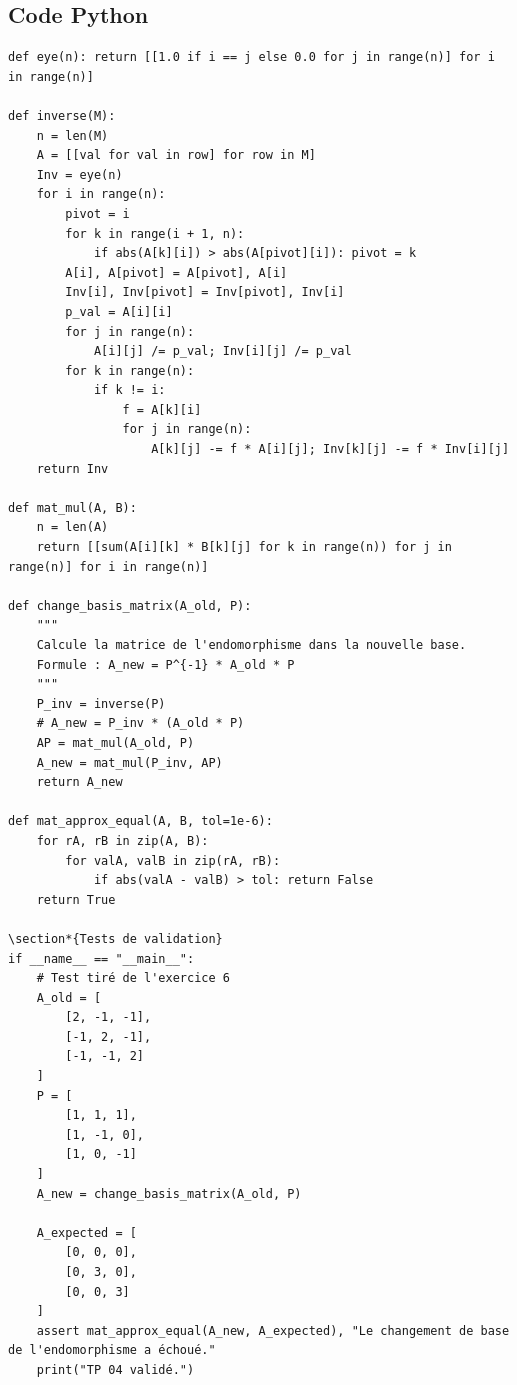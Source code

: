 \documentclass{report}
\begin{document}
\subsection*{Code Python}
\begin{verbatim}
def eye(n): return [[1.0 if i == j else 0.0 for j in range(n)] for i in range(n)]

def inverse(M):
    n = len(M)
    A = [[val for val in row] for row in M]
    Inv = eye(n)
    for i in range(n):
        pivot = i
        for k in range(i + 1, n):
            if abs(A[k][i]) > abs(A[pivot][i]): pivot = k
        A[i], A[pivot] = A[pivot], A[i]
        Inv[i], Inv[pivot] = Inv[pivot], Inv[i]
        p_val = A[i][i]
        for j in range(n):
            A[i][j] /= p_val; Inv[i][j] /= p_val
        for k in range(n):
            if k != i:
                f = A[k][i]
                for j in range(n):
                    A[k][j] -= f * A[i][j]; Inv[k][j] -= f * Inv[i][j]
    return Inv

def mat_mul(A, B):
    n = len(A)
    return [[sum(A[i][k] * B[k][j] for k in range(n)) for j in range(n)] for i in range(n)]

def change_basis_matrix(A_old, P):
    """
    Calcule la matrice de l'endomorphisme dans la nouvelle base.
    Formule : A_new = P^{-1} * A_old * P
    """
    P_inv = inverse(P)
    # A_new = P_inv * (A_old * P)
    AP = mat_mul(A_old, P)
    A_new = mat_mul(P_inv, AP)
    return A_new

def mat_approx_equal(A, B, tol=1e-6):
    for rA, rB in zip(A, B):
        for valA, valB in zip(rA, rB):
            if abs(valA - valB) > tol: return False
    return True

\section*{Tests de validation}
if __name__ == "__main__":
    # Test tiré de l'exercice 6
    A_old = [
        [2, -1, -1],
        [-1, 2, -1],
        [-1, -1, 2]
    ]
    P = [
        [1, 1, 1],
        [1, -1, 0],
        [1, 0, -1]
    ]
    A_new = change_basis_matrix(A_old, P)

    A_expected = [
        [0, 0, 0],
        [0, 3, 0],
        [0, 0, 3]
    ]
    assert mat_approx_equal(A_new, A_expected), "Le changement de base de l'endomorphisme a échoué."
    print("TP 04 validé.")
\end{verbatim}
\end{document}
